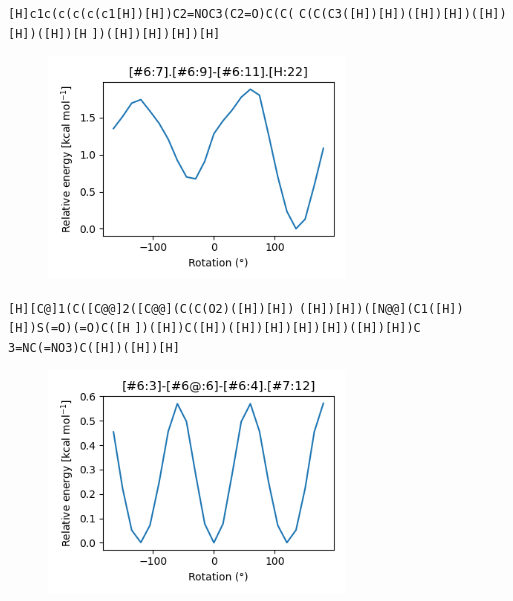 \documentclass{beamer}
\begin{document}
\begin{frame}[fragile]
\verb|[H]c1c(c(c(c(c1[H])[H])C2=NOC3(C2=O)C(C(|
\verb|C(C(C3([H])[H])([H])[H])([H])[H])([H])[H|
\verb|])([H])[H])[H])[H]|

\begin{figure}
    \includegraphics[width=0.7\textwidth,height=0.7\textheight,keepaspectratio]{plot06.png}
\end{figure}
\end{frame}
\begin{frame}[fragile]
\verb|[H][C@]1(C([C@@]2([C@@](C(C(O2)([H])[H])|
\verb|([H])[H])([N@@](C1([H])[H])S(=O)(=O)C([H|
\verb|])([H])C([H])([H])[H])[H])[H])([H])[H])C|
\verb|3=NC(=NO3)C([H])([H])[H]|

\begin{figure}
    \includegraphics[width=0.7\textwidth,height=0.7\textheight,keepaspectratio]{plot07.png}
\end{figure}
\end{frame}
\end{document}
